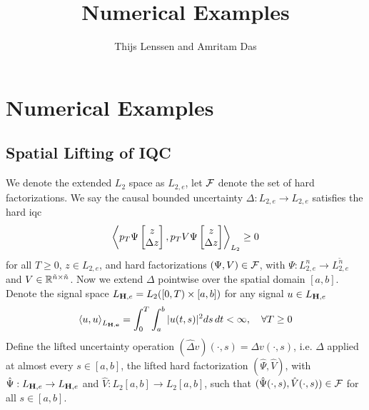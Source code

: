 \documentclass[journal,10pt,doublecolumn,twoside,a4paper]{IEEEtran}
\begin{document}
\title{Numerical Examples}
\author{Thijs Lenssen and Amritam Das}
\maketitle

\section{Numerical Examples}

\subsection{Spatial Lifting of IQC}
We denote the extended $L_2$ space as $L_{2,e}$, let $\mathcal{F}$ denote the set of hard factorizations. We say the causal bounded
uncertainty $\Delta : L_{2,e} \to L_{2,e}$ satisfies the hard iqc 
\begin{equation}\label{eqn:temporal-IQC}
    \left\langle p_T\Psi\begin{bmatrix}z\\ \Delta z\end{bmatrix}, p_T V\Psi\begin{bmatrix}z\\\Delta z\end{bmatrix} \right\rangle_{L_2}\geq 0
\end{equation}
for all $T\geq0$, $z\in L_{2,e}$, and hard factorizations $(\Psi, V) \in \mathcal{F}$, with $\Psi:L^n_{2,e}\to L^{\tilde{n}}_{2,e}$ and $V\in\mathbb{R}^{\tilde{n}\times \tilde{n}}$.
Now we extend $\Delta$ pointwise over the spatial domain $[a,b]$. Denote the signal space
$L_{\mathbf{H},e} = L_2([0,T)\times [a,b])$ for any  signal $u\in L_{\mathbf{H},e}$
\begin{equation}
    \left\langle u, u \right\rangle_{L_{\mathbf{H,e}}} = \int_0^T \int_a^b |u(t,s)|^2 ds\, dt < \infty, \quad \forall T \geq 0
\end{equation}
Define the lifted uncertainty operation $(\hat\Delta v)(\cdot,s) = \Delta v(\cdot,s)$, i.e. $\Delta$ applied at almost every $s\in[a,b]$,
the lifted hard factorization $(\hat{\Psi}, \hat{V})$, with $\hat{\Psi}:L_{\mathbf{H},e} \to L_{\mathbf{H},e}$ and
$\hat{V}:L_2[a,b] \to L_2[a,b]$, such that $(\hat{\Psi}(\cdot,s), \hat{V}(\cdot,s))\in\mathcal{F}$ for all $s\in[a,b]$.
\end{document}
